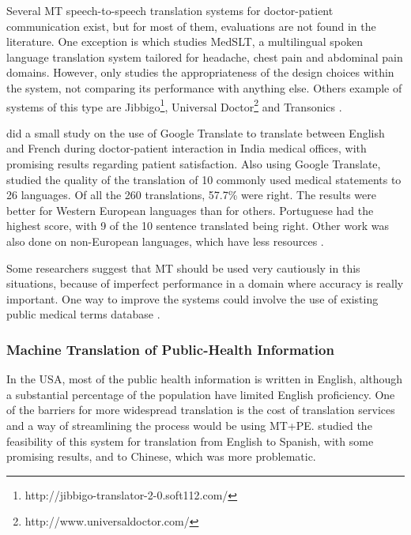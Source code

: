 Several MT speech-to-speech translation systems for doctor-patient communication exist, but for most of them, evaluations are not found in the literature. One exception is \citep{Bouillon2005} which studies MedSLT, a multilingual spoken language translation system tailored for headache, chest pain and abdominal pain domains. However, \citep{Bouillon2005} only studies the appropriateness of the design choices within the system, not comparing its performance with anything else. Others example of systems of this type are Jibbigo\footnote{http://jibbigo-translator-2-0.soft112.com/}, Universal Doctor\footnote{http://www.universaldoctor.com/} and Transonics \citep{Nagata2005}.

\citep{Kaliyadan2010} did a small study on the use of Google Translate to translate between English and French during doctor-patient interaction in India medical offices, with promising results regarding patient satisfaction. Also using Google Translate, \citep{Patil2014} studied the quality of the translation of 10 commonly used medical statements to 26 languages. Of all the 260 translations, 57.7\% were right. The results were better for Western European languages than for others. Portuguese had the highest score, with 9 of the 10 sentence translated being right. Other work was also done on non-European languages, which have less resources \citep{Musleh2016, Kathol2005}.

Some researchers \citep{G2013, Conference2012, Kaliyadan2010} suggest that MT should be used very cautiously in this situations, because of imperfect performance in a domain where accuracy is really important. One way to improve the systems could involve the use of existing public medical terms database \citep{Eck2004}.

\subsubsection{Machine Translation of Public-Health Information}

In the USA, most of the public health information is written in English, although a substantial percentage of the population have limited English proficiency. One of the barriers for more widespread translation is the cost of translation services and a way of streamlining the process would be using MT+PE. \citep{Kirchhoff2011, Turner2015} studied the feasibility of this system for translation from English to Spanish, with some promising results, and to Chinese, which was more problematic. 

